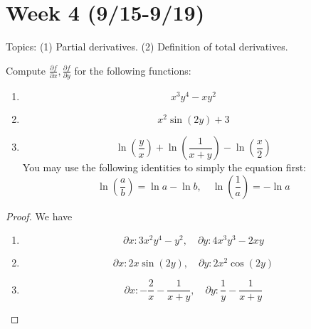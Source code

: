 \documentclass[openany]{book}
\begin{document}
\newpage
\section*{\centering Week 4 (9/15-9/19)}

\renewcommand\thesection{\arabic{section}}

\noindent
Topics: (1) Partial derivatives. (2) Definition of total derivatives.

\begin{prob}
    Compute $\frac{\partial f}{\partial x}, \frac{\partial f}{\partial y}$ for the following functions:
    \begin{enumerate}
        \item \begin{equation*}
            x^3y^4-xy^2
        \end{equation*}
        \item \begin{equation*}
            x^2\sin(2y)+3
        \end{equation*}
        \item \begin{equation*}
            \ln\left(\frac{y}{x}\right)+\ln\left(\frac{1}{x+y}\right)-\ln\left(\frac{x}{2}\right)
        \end{equation*}
        You may use the following identities to simply the equation first:
        \begin{equation*}
            \ln\left(\frac{a}{b}\right)=\ln a-\ln b, \quad \ln\left(\frac{1}{a}\right)=-\ln a
        \end{equation*}
    \end{enumerate}
\end{prob}
\begin{proof}
    We have 
    \begin{enumerate}
        \item \begin{equation*}
            \partial x: 3x^2y^4-y^2, \quad \partial y: 4x^3y^3-2xy
        \end{equation*}
        \item \begin{equation*}
            \partial x: 2x\sin(2y), \quad \partial y: 2x^2\cos(2y)
        \end{equation*}
        \item \begin{equation*}
            \partial x: -\frac{2}{x}-\frac{1}{x+y}, \quad \partial y: \frac{1}{y}-\frac{1}{x+y}
        \end{equation*}
    \end{enumerate}
\end{proof}
\end{document}
